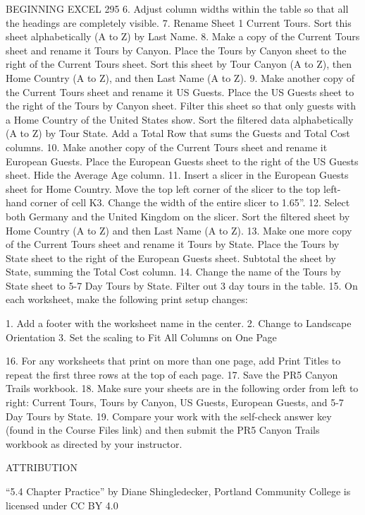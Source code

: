 BEGINNING EXCEL 295
6. Adjust column widths within the table so that all the headings are completely visible.
7. Rename Sheet 1 Current Tours. Sort this sheet alphabetically (A to Z) by Last Name.
8. Make a copy of the Current Tours sheet and rename it Tours by Canyon. Place the Tours by
Canyon sheet to the right of the Current Tours sheet. Sort this sheet by Tour Canyon (A to Z),
then Home Country (A to Z), and then Last Name (A to Z).
9. Make another copy of the Current Tours sheet and rename it US Guests. Place the US Guests
sheet to the right of the Tours by Canyon sheet. Filter this sheet so that only guests with a Home
Country of the United States show. Sort the filtered data alphabetically (A to Z) by Tour State.
Add a Total Row that sums the Guests and Total Cost columns.
10. Make another copy of the Current Tours sheet and rename it European Guests. Place the
European Guests sheet to the right of the US Guests sheet. Hide the Average Age column.
11. Insert a slicer in the European Guests sheet for Home Country. Move the top left corner of the
slicer to the top left-hand corner of cell K3. Change the width of the entire slicer to 1.65”.
12. Select both Germany and the United Kingdom on the slicer. Sort the filtered sheet by Home
Country (A to Z) and then Last Name (A to Z).
13. Make one more copy of the Current Tours sheet and rename it Tours by State. Place the Tours
by State sheet to the right of the European Guests sheet. Subtotal the sheet by State, summing
the Total Cost column.
14. Change the name of the Tours by State sheet to 5-7 Day Tours by State. Filter out 3 day tours in
the table.
15. On each worksheet, make the following print setup changes:

1. Add a footer with the worksheet name in the center.
2. Change to Landscape Orientation
3. Set the scaling to Fit All Columns on One Page

16. For any worksheets that print on more than one page, add Print Titles to repeat the first three
rows at the top of each page.
17. Save the PR5 Canyon Trails workbook.
18. Make sure your sheets are in the following order from left to right: Current Tours, Tours by
Canyon, US Guests, European Guests, and 5-7 Day Tours by State.
19. Compare your work with the self-check answer key (found in the Course Files link) and then
submit the PR5 Canyon Trails workbook as directed by your instructor.

ATTRIBUTION

“5.4 Chapter Practice” by Diane Shingledecker, Portland Community College is licensed under CC
BY 4.0

